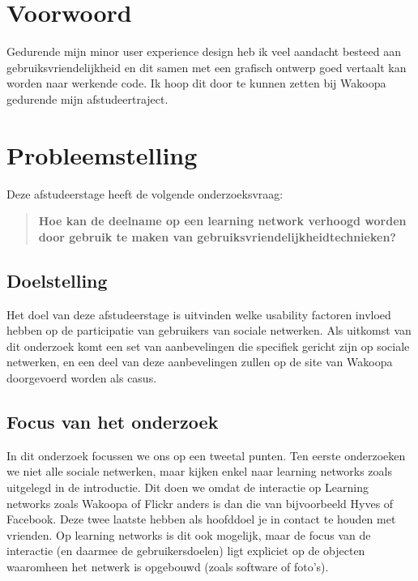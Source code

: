 \documentclass[a4paper, 10pt, pdftex]{report}
\begin{document}
  \newpage
  \section*{Voorwoord}

    Gedurende mijn minor user experience design heb ik veel aandacht besteed aan gebruiksvriendelijkheid en dit samen met een grafisch ontwerp goed vertaalt kan worden naar werkende code. Ik hoop dit door te kunnen zetten bij Wakoopa gedurende mijn afstudeertraject.

  \newpage
  \section*{Probleemstelling}
    Deze afstudeerstage heeft de volgende onderzoeksvraag:
    \begin{quotation}
     \textbf{Hoe kan de deelname op een learning network verhoogd worden door gebruik te maken van gebruiksvriendelijkheidtechnieken?}
    \end{quotation}

    \subsection*{Doelstelling}

    Het doel van deze afstudeerstage is uitvinden welke usability factoren invloed hebben op de participatie van gebruikers van sociale netwerken. Als uitkomst van dit onderzoek komt een set van aanbevelingen die specifiek gericht zijn op sociale netwerken, en een deel van deze aanbevelingen zullen op de site van Wakoopa doorgevoerd worden als casus.

  \subsection*{Focus van het onderzoek}
    In dit onderzoek focussen we ons op een tweetal punten. Ten eerste onderzoeken we niet alle sociale netwerken, maar kijken enkel naar learning networks zoals uitgelegd in de introductie. Dit doen we omdat de interactie op Learning networks zoals Wakoopa of Flickr anders is dan die van bijvoorbeeld Hyves of Facebook. Deze twee laatste hebben als hoofddoel je in contact te houden met vrienden. Op learning networks is dit ook mogelijk, maar de focus van de interactie (en daarmee de gebruikersdoelen) ligt expliciet op de objecten waaromheen het netwerk is opgebouwd (zoals software of foto's).
\end{document}
